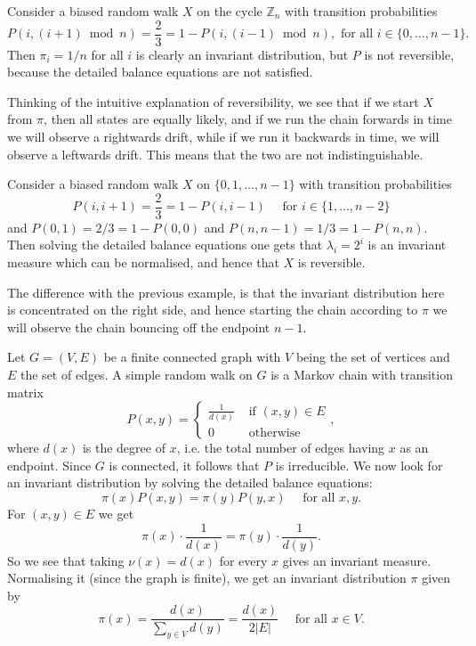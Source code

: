 \documentclass[a4paper,11pt]{article}
\begin{document}
\begin{example}
    Consider a biased random walk $X$ on the cycle $\mathbb{Z}_n$ with transition probabilities
    \[
    P(i,(i+1) \bmod n)=\frac{2}{3}=1-P(i,(i-1) \bmod n), \text { for all } i \in\{0, \ldots, n-1\} .
    \]
    Then $\pi_i=1 / n$ for all $i$ is clearly an invariant distribution, but $P$ is not reversible, because the detailed balance equations are not satisfied. 
    
    Thinking of the intuitive explanation of reversibility, we see that if we start $X$ from $\pi$, then all states are equally likely, and if we run the chain forwards in time we will observe a rightwards drift, while if we run it backwards in time, we will observe a leftwards drift. This means that the two are not indistinguishable.
\end{example}

\begin{example}
    Consider a biased random walk $X$ on $\{0,1, \ldots, n-1\}$ with transition probabilities
    \[
    P(i, i+1)=\frac{2}{3}=1-P(i, i-1) \quad \text { for } i \in\{1, \ldots, n-2\}
    \]
    and $P(0,1)=2 / 3=1-P(0,0)$ and $P(n, n-1)=1 / 3=1-P(n, n)$. Then solving the detailed balance equations one gets that $\lambda_i=2^i$ is an invariant measure which can be normalised, and hence that $X$ is reversible. 
    
    The difference with the previous example, is that the invariant distribution here is concentrated on the right side, and hence starting the chain according to $\pi$ we will observe the chain bouncing off the endpoint $n-1$.
\end{example}
\begin{example}
    Let $G=(V, E)$ be a finite connected graph with $V$ being the set of vertices and $E$ the set of edges. A simple random walk on $G$ is a Markov chain with transition matrix
    \[
    P(x, y)=\left\{\begin{array}{ll}
    \frac{1}{d(x)} & \text { if }(x, y) \in E \\
    0 & \text { otherwise }
    \end{array},\right.
    \]
    where $d(x)$ is the degree of $x$, i.e. the total number of edges having $x$ as an endpoint. Since $G$ is connected, it follows that $P$ is irreducible. We now look for an invariant distribution by solving the detailed balance equations:
    \[
    \pi(x) P(x, y)=\pi(y) P(y, x) \quad \text { for all } x, y .
    \]
    For $(x, y) \in E$ we get
    \[
    \pi(x) \cdot \frac{1}{d(x)}=\pi(y) \cdot \frac{1}{d(y)} .
    \]
    So we see that taking $\nu(x)=d(x)$ for every $x$ gives an invariant measure. Normalising it (since the graph is finite), we get an invariant distribution $\pi$ given by
    \[
    \pi(x)=\frac{d(x)}{\sum_{y \in V} d(y)}=\frac{d(x)}{2|E|} \quad \text { for all } x \in V .
    \]
\end{example}
\end{document}
